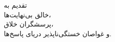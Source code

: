\begin{acknowledgementpage}

\vspace{1.5cm}

{\nastaliq
{
تقدیم به \\
خالق بی‌نهایت‌ها،\\
پرسشگران خلاق، \\
و غواصان خستگی‌ناپذیر دریای پاسخ‌ها.\\
}}\end{acknowledgementpage}
\newpage